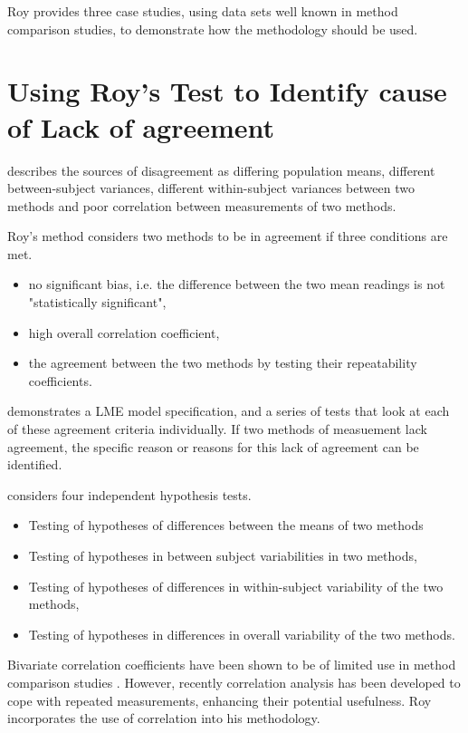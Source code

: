 \documentclass[12pt, a4paper]{report}
\theoremstyle{plain}
\theoremstyle{definition}
\theoremstyle{remark}
\begin{document}
	Roy provides three case studies, using data sets well known in method comparison studies, to demonstrate how the methodology should be used.
	
	
	\section*{Using Roy's Test to Identify cause of Lack of agreement}
	\citet{Barnhart}  describes the sources of disagreement as
	differing population means, different between-subject variances,
	different within-subject variances between two methods and poor
	correlation between measurements of two methods.
	
	
	Roy's method considers two methods to be in agreement if three
	conditions are met.
	
	\begin{itemize}
		\item no significant bias, i.e. the difference between the two
		mean readings is not "statistically significant",
		
		\item high overall correlation coefficient,
		
		\item the agreement between the two methods by testing their
		repeatability coefficients.
		
	\end{itemize}
	
	\citet{ARoy2009} demonstrates a LME model specification, and a series of tests that look at each of these agreement criteria individually. If two methods of measuement lack agreement, the specific reason or reasons for this lack of agreement can be identified.

	\citet{ARoy2009} considers four independent hypothesis tests.
	\begin{itemize}
		\item Testing of hypotheses of differences between the means of
		two methods\item Testing of hypotheses in between subject
		variabilities in two methods, \item Testing of hypotheses of
		differences in within-subject variability of the two methods,
		\item Testing of hypotheses in differences in overall variability
		of the two methods.
	\end{itemize}
	
	Bivariate correlation coefficients have been shown to be of
	limited use in method comparison studies \citep{BA86}. However,
	recently correlation analysis has been developed to cope with
	repeated measurements, enhancing their potential usefulness. Roy
	incorporates the use of correlation into his methodology.	
\end{document}

